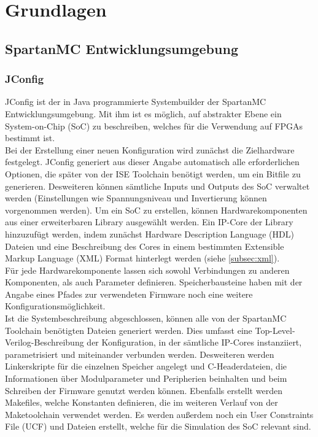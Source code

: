 \chapter{Grundlagen}
\section{SpartanMC Entwicklungsumgebung}
\subsection{JConfig}
JConfig ist der in Java programmierte Systembuilder der SpartanMC Entwicklungsumgebung. Mit ihm ist es möglich,
auf abstrakter Ebene ein System-on-Chip (SoC) zu beschreiben, welches für die Verwendung auf FPGAs bestimmt ist. \\
Bei der Erstellung einer neuen Konfiguration wird zunächst die Zielhardware festgelegt. JConfig generiert aus dieser
Angabe automatisch alle erforderlichen Optionen, die später von der ISE Toolchain benötigt werden, um ein Bitfile
zu generieren. Desweiteren können sämtliche Inputs und Outputs des SoC verwaltet werden (Einstellungen wie Spannungsniveau 
und Invertierung können vorgenommen werden).
Um ein SoC zu erstellen, können Hardwarekomponenten aus einer erweiterbaren Library ausgewählt werden. Ein IP-Core der
Library hinzuzufügt werden, indem zunächst Hardware Description Language (HDL) Dateien und eine Beschreibung des Cores in einem bestimmten Extensible Markup Language (XML) Format hinterlegt werden (siehe \ref{subsec:xml}).\\
Für jede Hardwarekomponente lassen sich sowohl Verbindungen zu anderen Komponenten, als auch Parameter definieren.
Speicherbausteine haben mit der Angabe eines Pfades zur verwendeten Firmware noch eine weitere Konfigurationsmöglichkeit.\\
Ist die Systembeschreibung abgeschlossen, können alle von der SpartanMC Toolchain benötigten Dateien generiert werden.
Dies umfasst eine Top-Level-Verilog-Beschreibung der Konfiguration, in der sämtliche IP-Cores instanziiert, parametrisiert und miteinander verbunden werden. Desweiteren werden Linkerskripte für die einzelnen Speicher angelegt und C-Headerdateien, die Informationen
über Modulparameter und Peripherien beinhalten und beim Schreiben der Firmware genutzt werden können. Ebenfalls erstellt werden
Makefiles, welche Konstanten definieren, die im weiteren Verlauf von der Maketoolchain verwendet werden. Es werden außerdem noch ein
User Constraints File (UCF) und Dateien erstellt, welche für die Simulation des SoC relevant sind.

